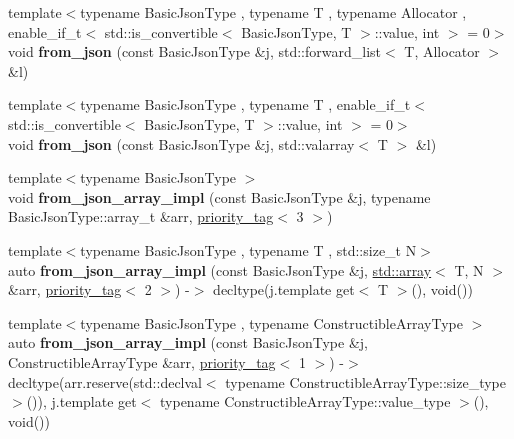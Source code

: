 \begin{DoxyCompactItemize}
{\footnotesize template$<$typename Basic\+Json\+Type , typename T , typename Allocator , enable\+\_\+if\+\_\+t$<$ std\+::is\+\_\+convertible$<$ Basic\+Json\+Type, T $>$\+::value, int $>$  = 0$>$ }\\void {\bfseries from\+\_\+json} (const Basic\+Json\+Type \&j, std\+::forward\+\_\+list$<$ T, Allocator $>$ \&l)
\item 
\mbox{\label{namespacenlohmann_1_1detail_a3df497b1d3977f071b488ecac1401517}} 
{\footnotesize template$<$typename Basic\+Json\+Type , typename T , enable\+\_\+if\+\_\+t$<$ std\+::is\+\_\+convertible$<$ Basic\+Json\+Type, T $>$\+::value, int $>$  = 0$>$ }\\void {\bfseries from\+\_\+json} (const Basic\+Json\+Type \&j, std\+::valarray$<$ T $>$ \&l)
\item 
\mbox{\label{namespacenlohmann_1_1detail_a40f7bb070a60e8ba14fffb9c117fcbd8}} 
{\footnotesize template$<$typename Basic\+Json\+Type $>$ }\\void {\bfseries from\+\_\+json\+\_\+array\+\_\+impl} (const Basic\+Json\+Type \&j, typename Basic\+Json\+Type\+::array\+\_\+t \&arr, \hyperlink{structnlohmann_1_1detail_1_1priority__tag}{priority\+\_\+tag}$<$ 3 $>$)
\item 
\mbox{\label{namespacenlohmann_1_1detail_aba0ce45ebb69fd2c7132a00f9a56b503}} 
{\footnotesize template$<$typename Basic\+Json\+Type , typename T , std\+::size\+\_\+t N$>$ }\\auto {\bfseries from\+\_\+json\+\_\+array\+\_\+impl} (const Basic\+Json\+Type \&j, \hyperlink{namespacenlohmann_1_1detail_a1ed8fc6239da25abcaf681d30ace4985af1f713c9e000f5d3f280adbd124df4f5}{std\+::array}$<$ T, N $>$ \&arr, \hyperlink{structnlohmann_1_1detail_1_1priority__tag}{priority\+\_\+tag}$<$ 2 $>$) -\/$>$ decltype(j.\+template get$<$ T $>$(), void())
\item 
\mbox{\label{namespacenlohmann_1_1detail_a464e1246f3df7edea79c3f81ab701edd}} 
{\footnotesize template$<$typename Basic\+Json\+Type , typename Constructible\+Array\+Type $>$ }\\auto {\bfseries from\+\_\+json\+\_\+array\+\_\+impl} (const Basic\+Json\+Type \&j, Constructible\+Array\+Type \&arr, \hyperlink{structnlohmann_1_1detail_1_1priority__tag}{priority\+\_\+tag}$<$ 1 $>$) -\/$>$ decltype(arr.\+reserve(std\+::declval$<$ typename Constructible\+Array\+Type\+::size\+\_\+type $>$()), j.\+template get$<$ typename Constructible\+Array\+Type\+::value\+\_\+type $>$(), void())

\end{DoxyCompactItemize}
